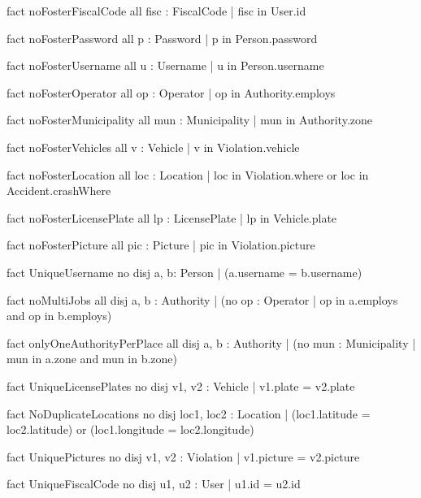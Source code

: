 \begin{alloy}
fact noFosterFiscalCode {
    all fisc : FiscalCode | fisc in User.id
}

fact noFosterPassword {
    all p : Password | p in Person.password
}

fact noFosterUsername {
    all u : Username | u in Person.username
}

fact noFosterOperator {
    all op : Operator | op in Authority.employs
}

fact noFosterMunicipality {
    all mun : Municipality | mun in Authority.zone
}

fact noFosterVehicles {
    all v : Vehicle | v in Violation.vehicle
}

fact noFosterLocation {
    all loc : Location | loc in Violation.where or loc in Accident.crashWhere
}

fact noFosterLicensePlate{
    all lp : LicensePlate | lp in Vehicle.plate
}

fact noFosterPicture{
    all pic : Picture | pic in Violation.picture
}

fact UniqueUsername {
    no disj a, b: Person | (a.username = b.username)
} 

fact noMultiJobs {
    all disj a, b : Authority | (no op : Operator | 
        op in a.employs and op in b.employs)
}

fact onlyOneAuthorityPerPlace {
    all disj a, b : Authority | (no mun : Municipality | 
        mun in a.zone and mun in b.zone)
}

fact UniqueLicensePlates {
    no disj v1, v2 : Vehicle | v1.plate = v2.plate
}

fact NoDuplicateLocations {
    no disj loc1, loc2 : Location | (loc1.latitude = loc2.latitude) or 
        (loc1.longitude = loc2.longitude)
}

fact UniquePictures {
    no disj v1, v2 : Violation | v1.picture = v2.picture
}

fact UniqueFiscalCode{
    no disj u1, u2 : User | u1.id = u2.id
}
\end{alloy}